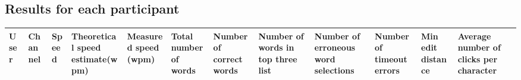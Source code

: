 \documentclass[10pt,fleqn,a4paper]{article}
\begin{document}
\subsection{Results for each participant}
{\small
 \begin{tabular}{|p{0.5cm}|p{1cm}|p{1.0cm}|p{1.5cm}|p{1.2cm}|p{1.2cm}|p{1.2cm}|p{1.2cm}|p{1.2cm}|p{1.2cm}|p{1.2cm}|p{1.2cm}|} \hline


{\bf User } & {\bf Channel} & {\bf Speed} & {\bf Theoretical speed estimate(wpm)} & {\bf Measured speed (wpm)} & {\bf Total number of words} & {\bf Number of correct words} & {\bf Number of words in top three list}  & {\bf Number of erroneous word selections} & {\bf Number of  timeout errors} & {\bf Min edit distance} & {\bf Average number of clicks per character}  \\ \hline



\end{tabular}}
\end{document}
